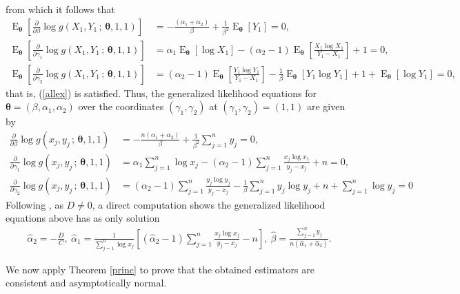\documentclass[10pt,a4paper,onecolumn]{article} %
\newcommand{\bs}{\boldsymbol}
\newcommand{\on}{\operatorname}
\begin{document}
from which it follows that\begin{align*}
\on{E}_{\bs{\theta}} \left[\frac{\partial}{\partial \beta}  \log g(X_1,Y_1\,;\,\bs{\theta},1,1)\right] &= -\frac{(\alpha_1 + \alpha_2)}{\beta} + \frac{1}{\beta^2} \on{E}_{\bs{\theta}}[Y_1] = 0, \\
\on{E}_{\bs{\theta}} \left[\frac{\partial}{\partial \gamma_1}  \log g(X_1,Y_1\,;\,\bs{\theta},1,1)\right] &= \alpha_1 \on{E}_{\bs{\theta}}[\log X_1] - (\alpha_2 - 1) \on{E}_{\bs{\theta}}\left[\frac{X_1 \log X_1}{Y_1 - X_1}\right] + 1 = 0, \\
\on{E}_{\bs{\theta}} \left[\frac{\partial}{\partial \gamma_2}  \log g(X_1,Y_1\,;\,\bs{\theta},1,1)\right] &= (\alpha_2 - 1) \on{E}_{\bs{\theta}}\left[\frac{Y_1 \log Y_1}{Y_1 - X_1}\right] - \frac{1}{\beta} \on{E}_{\bs{\theta}}\left[Y_1 \log Y_1\right] + 1 + \on{E}_{\bs{\theta}}\left[\log Y_1\right]=0,
\end{align*}
that is, (\ref{allex}) is satisfied. Thus, the generalized likelihood equations for $\bs{\theta}=(\beta,\alpha_1,\alpha_2)$ over the coordinates $(\gamma_1,\gamma_2)$ at $(\gamma_1,\gamma_2)=(1,1)$ are given by
\begin{align*}
\frac{\partial}{\partial \beta}  \log g(x_j,y_j\,;\,\bs{\theta},1,1) &= -\frac{n (\alpha_1 + \alpha_2)}{\beta} + \frac{1}{\beta^2} \sum_{j=1}^{n} y_j = 0, \\
\frac{\partial}{\partial \gamma_1}  \log g(x_j,y_j\,;\,\bs{\theta},1,1) &= \alpha_1 \sum_{j=1}^{n} \log x_j - (\alpha_2 - 1) \sum_{j=1}^{n} \frac{x_j \log x_1}{y_j - x_j} + n = 0, \\
\frac{\partial}{\partial \gamma_2}  \log g(x_j,y_j\,;\,\bs{\theta},1,1) &= (\alpha_2 - 1) \sum_{j=1}^{n} \frac{y_j \log y_j}{y_j - x_j} - \frac{1}{\beta} \sum_{j=1}^{n} y_j \log y_j + n + \sum_{j=1}^{n} \log y_j = 0
\end{align*}
Following \cite{louzada2019note}, as $D\neq 0$, a direct computation shows the generalized likelihood equations above has as only solution
\begin{align*}
\hat{\alpha}_2 = -\frac{D}{C}, \
\hat{\alpha}_1 = \frac{1}{\sum_{j=1}^{n} \log x_j} \left[ (\hat{\alpha}_2 - 1) \sum_{j=1}^{n} \frac{x_j \log x_j}{y_j - x_j} - n \right], \
\hat{\beta} = \frac{\sum_{j=1}^{n} y_j}{n (\hat{\alpha}_1 + \hat{\alpha}_2)}.
\end{align*}

We now apply Theorem \ref{princ} to prove that the obtained estimators are consistent and asymptotically normal.
\end{document}
